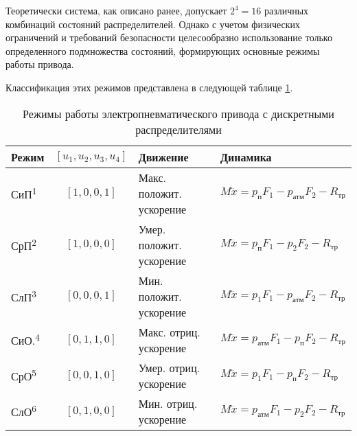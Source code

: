 Теоретически система, как описано ранее, допускает $2^4 = 16$ различных комбинаций состояний распределителей.
Однако с учетом физических ограничений и требований безопасности целесообразно использование только определенного
подмножества состояний, формирующих основные режимы работы привода.

Классификация этих режимов представлена в следующей таблице \ref{tab:operation_modes}.

\begin{table}[htbp]
	\centering
	\caption{Режимы работы электропневматического привода с дискретными распределителями}
	\label{tab:operation_modes}
	\small
	\begin{tabular}{lcll}
		\midrule
		\textbf{Режим}           & $[u_1,u_2,u_3,u_4]$ & \textbf{Движение} & \textbf{Динамика} \\
		\midrule
		СиП\textsuperscript{1}   & $[1,0,0,1]$         &
		Макс. положит. ускорение &
		$M\ddot{x} = p_\text{п}F_1 - p_\text{атм}F_2 - R_\text{тр}$                            \\

		СрП\textsuperscript{2}   & $[1,0,0,0]$         &
		Умер. положит. ускорение &
		$M\ddot{x} = p_\text{п}F_1 - p_2F_2 - R_\text{тр}$                                     \\

		СлП\textsuperscript{3}   & $[0,0,0,1]$         &
		Мин. положит. ускорение  &
		$M\ddot{x} = p_1F_1 - p_\text{атм}F_2 - R_\text{тр}$                                   \\

		СиО.\textsuperscript{4}  & $[0,1,1,0]$         &
		Макс. отриц. ускорение   &
		$M\ddot{x} = p_\text{атм}F_1 - p_\text{п}F_2 - R_\text{тр}$                            \\

		СрО\textsuperscript{5}   & $[0,0,1,0]$         &
		Умер. отриц. ускорение   &
		$M\ddot{x} = p_1F_1 - p_\text{п}F_2 - R_\text{тр}$                                     \\

		СлО\textsuperscript{6}   & $[0,1,0,0]$         &
		Мин. отриц. ускорение    &
		$M\ddot{x} = p_\text{атм}F_1 - p_2F_2 - R_\text{тр}$                                   \\


\end{tabular}
\end{table}
